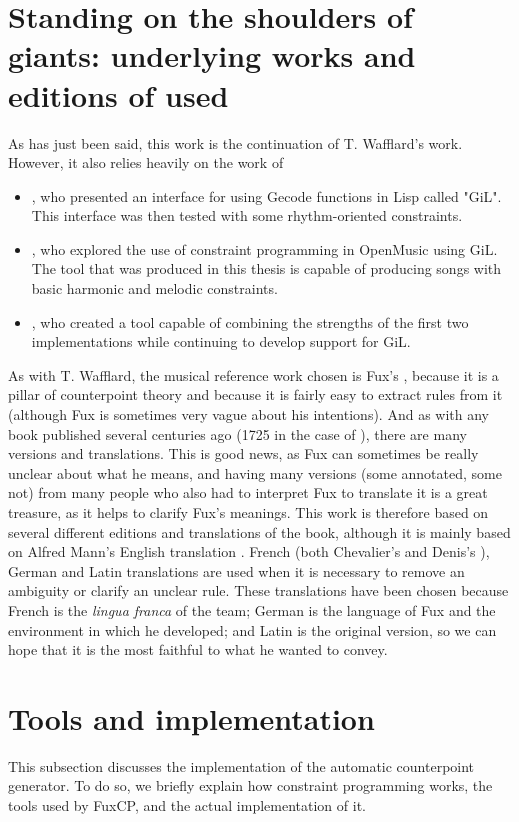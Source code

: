 \section{Standing on the shoulders of giants: underlying works and editions of \gaps used}
As has just been said, this work is the continuation of T. Wafflard's work. However, it also relies heavily on the work of
\begin{itemize}
    \item \textcite{GiLthesis}, who presented an interface for using Gecode functions in Lisp called "GiL". This interface was then tested with some rhythm-oriented constraints.
    \item \textcite{Melothesis}, who explored the use of constraint programming in OpenMusic using GiL. The tool that was produced in this thesis is capable of producing songs with basic harmonic and melodic constraints.
    \item \textcite{Melo2thesis}, who created a tool capable of combining the strengths of the first two implementations while continuing to develop support for GiL.
\end{itemize}

As with T. Wafflard, the musical reference work chosen is Fux's \gap, because it is a pillar of counterpoint theory and because it is fairly easy to extract rules from it (although Fux is sometimes very vague about his intentions). And as with any book published several centuries ago (1725 in the case of \gap), there are many versions and translations. This is good news, as Fux can sometimes be really unclear about what he means, and having many versions (some annotated, some not) from many people who also had to interpret Fux to translate it is a great treasure, as it helps to clarify Fux's meanings. This work is therefore based on several different editions and translations of the book, although it is mainly based on Alfred Mann's English translation \cite{GaPEng}. French (both Chevalier's \cite{GaPFrChevalier} and Denis's \cite{GaPFrDenis}), German \cite{GaPDe} and Latin \cite{GapLa} translations are used when it is necessary to remove an ambiguity or clarify an unclear rule. These translations have been chosen because French is the \textit{lingua franca} of the team; German is the language of Fux and the environment in which he developed; and Latin is the original version, so we can hope that it is the most faithful to what he wanted to convey.

\section{Tools and implementation}\label{subsection:tools-and-implementation}
This subsection discusses the implementation of the automatic counterpoint generator. To do so, we briefly explain how constraint programming works, the tools used by FuxCP, and the actual implementation of it.

